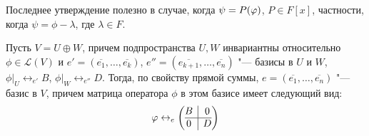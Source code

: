 \begin{note}
	Последнее утверждение полезно в случае, когда $\psi \hm{=} P(\phi)$, $P \in F[x]$, частности, когда $\psi = \phi - \lambda$, где $\lambda \in F$.
\end{note}

\begin{note}
	Пусть $V = U \oplus W$, причем подпространства $U, W$ инвариантны относительно $\phi \in \mathcal{L}(V)$ и $e' = (\overline{e_1}, \dots, \overline{e_k})$, $e'' = (\overline{e_{k + 1}}, \dots, \overline{e_n})$ "--- базисы в $U$ и $W$, $\phi|_U \leftrightarrow_{e'} B$, $\phi|_W \leftrightarrow_{e''} D$. Тогда, по свойству прямой суммы, $e = (\overline{e_1}, \dots, \overline{e_n})$ "--- базис в $V$, причем матрица оператора $\phi$ в этом базисе имеет следующий вид:
	\[\phi \leftrightarrow_e \left(\begin{array}{@{}c|c@{}}
	B & 0\\
	\hline
	0 & D
	\end{array}\right)\]
\end{note}